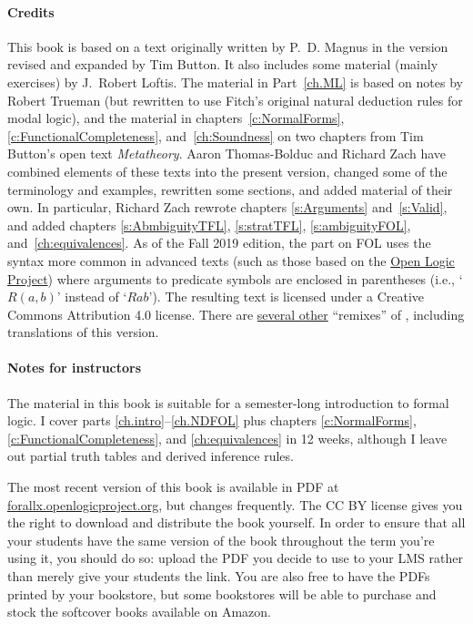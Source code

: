 \paragraph{Credits} This book is based on a text originally written by P.~D. Magnus in the version revised and expanded by Tim Button. It also includes some material (mainly exercises) by J.~Robert Loftis. The material in Part~\ref{ch.ML} is based on notes by Robert Trueman (but rewritten to use Fitch's original natural deduction rules for modal logic), and the material in chapters~\ref{c:NormalForms}, \ref{c:FunctionalCompleteness}, and~\ref{ch:Soundness} on two chapters from Tim Button's open text \textit{Metatheory}. Aaron Thomas-Bolduc and Richard Zach have combined elements of these texts into the present version, changed some of the terminology and examples, rewritten some sections, and added material of their own.  In particular, Richard Zach rewrote chapters \ref{s:Arguments} and~\ref{s:Valid}, and added chapters \ref{s:AbmbiguityTFL}, \ref{s:stratTFL}, \ref{s:ambiguityFOL}, and~\ref{ch:equivalences}. As of the Fall 2019 edition, the part on FOL uses the syntax more common in advanced texts (such as those based on the \href{https://openlogicproject.org/}{Open Logic Project}) where arguments to predicate symbols are enclosed in parentheses (i.e., `$R(a,b)$' instead of `$Rab$'). The resulting text is licensed under a Creative Commons Attribution 4.0 license. There are \href{https://github.com/OpenLogicProject/OpenLogic/wiki/Other-Logic-Textbooks}{several other} ``remixes'' of \forallx, including translations of this version.

\paragraph{Notes for instructors} The material in this book is suitable for a semester-long introduction to formal logic. I cover parts \ref{ch.intro}--\ref{ch.NDFOL} plus chapters \ref{c:NormalForms}, \ref{c:FunctionalCompleteness}, and \ref{ch:equivalences} in 12 weeks, although I leave out partial truth tables and derived inference rules.

The most recent version of this book is available in PDF at \href{https://forallx.openlogicproject.org}{forallx.openlogicproject.org}, but changes frequently.  The CC BY license gives you the right to download and distribute the book yourself. In order to ensure that all your students have the same version of the book throughout the term you're using it, you should do so: upload the PDF you decide to use to your LMS rather than merely give your students the link. You are also free to have the PDFs printed by your bookstore, but some bookstores will be able to purchase and stock the softcover books available on Amazon.

